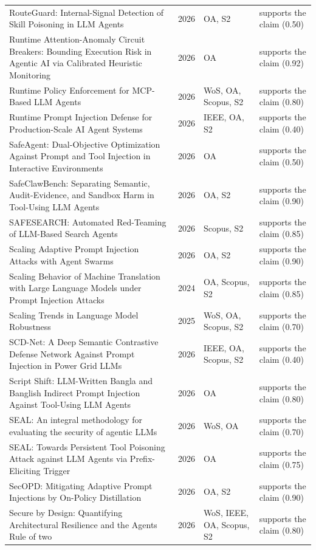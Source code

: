 \begin{longtable}{@{}%
  >{\raggedright\arraybackslash}p{}c%
  >{\raggedright\arraybackslash}p{}%
  >{\raggedright\arraybackslash}p{}@{}}
RouteGuard: Internal-Signal Detection of Skill Poisoning in LLM Agents & 2026 & OA, S2 & supports the claim (0.50) \\
Runtime Attention-Anomaly Circuit Breakers: Bounding Execution Risk in Agentic AI via Calibrated Heuristic Monitoring & 2026 & OA & supports the claim (0.92) \\
Runtime Policy Enforcement for MCP-Based LLM Agents & 2026 & WoS, OA, Scopus, S2 & supports the claim (0.80) \\
Runtime Prompt Injection Defense for Production-Scale AI Agent Systems & 2026 & IEEE, OA, S2 & supports the claim (0.40) \\
SafeAgent: Dual-Objective Optimization Against Prompt and Tool Injection in Interactive Environments & 2026 & OA & supports the claim (0.50) \\
SafeClawBench: Separating Semantic, Audit-Evidence, and Sandbox Harm in Tool-Using LLM Agents & 2026 & OA, S2 & supports the claim (0.90) \\
SAFESEARCH: Automated Red-Teaming of LLM-Based Search Agents & 2026 & Scopus, S2 & supports the claim (0.85) \\
Scaling Adaptive Prompt Injection Attacks with Agent Swarms & 2026 & OA, S2 & supports the claim (0.90) \\
Scaling Behavior of Machine Translation with Large Language Models under Prompt Injection Attacks & 2024 & OA, Scopus, S2 & supports the claim (0.85) \\
Scaling Trends in Language Model Robustness & 2025 & WoS, OA, Scopus, S2 & supports the claim (0.70) \\
SCD-Net: A Deep Semantic Contrastive Defense Network Against Prompt Injection in Power Grid LLMs & 2026 & IEEE, OA, Scopus, S2 & supports the claim (0.40) \\
Script Shift: LLM-Written Bangla and Banglish Indirect Prompt Injection Against Tool-Using LLM Agents & 2026 & OA & supports the claim (0.80) \\
SEAL: An integral methodology for evaluating the security of agentic LLMs & 2026 & WoS, OA & supports the claim (0.70) \\
SEAL: Towards Persistent Tool Poisoning Attack against LLM Agents via Prefix-Eliciting Trigger & 2026 & OA & supports the claim (0.75) \\
SecOPD: Mitigating Adaptive Prompt Injections by On-Policy Distillation & 2026 & OA, S2 & supports the claim (0.90) \\
Secure by Design: Quantifying Architectural Resilience and the Agents Rule of two & 2026 & WoS, IEEE, OA, Scopus, S2 & supports the claim (0.80) \\

\end{longtable}
